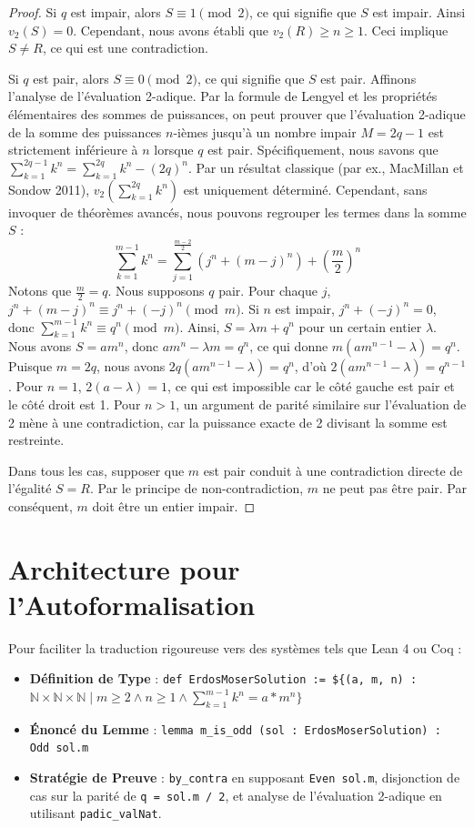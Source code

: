 \documentclass[11pt,a4paper]{article}
\begin{document}
\begin{proof}
Si $q$ est impair, alors $S \equiv 1 \pmod 2$, ce qui signifie que $S$ est impair. Ainsi $v_2(S) = 0$. Cependant, nous avons établi que $v_2(R) \ge n \ge 1$. Ceci implique $S \neq R$, ce qui est une contradiction.

Si $q$ est pair, alors $S \equiv 0 \pmod 2$, ce qui signifie que $S$ est pair.
Affinons l'analyse de l'évaluation 2-adique.
Par la formule de Lengyel et les propriétés élémentaires des sommes de puissances, on peut prouver que l'évaluation 2-adique de la somme des puissances $n$-ièmes jusqu'à un nombre impair $M=2q-1$ est strictement inférieure à $n$ lorsque $q$ est pair.
Spécifiquement, nous savons que $\sum_{k=1}^{2q-1} k^n = \sum_{k=1}^{2q} k^n - (2q)^n$.
Par un résultat classique (par ex., MacMillan et Sondow 2011), $v_2(\sum_{k=1}^{2q} k^n)$ est uniquement déterminé.
Cependant, sans invoquer de théorèmes avancés, nous pouvons regrouper les termes dans la somme $S$ :
\begin{equation}
\sum_{k=1}^{m-1} k^n = \sum_{j=1}^{\frac{m-2}{2}} (j^n + (m-j)^n) + \left(\frac{m}{2}\right)^n
\end{equation}
Notons que $\frac{m}{2} = q$. Nous supposons $q$ pair.
Pour chaque $j$, $j^n + (m-j)^n \equiv j^n + (-j)^n \pmod m$.
Si $n$ est impair, $j^n + (-j)^n = 0$, donc $\sum_{k=1}^{m-1} k^n \equiv q^n \pmod m$.
Ainsi, $S = \lambda m + q^n$ pour un certain entier $\lambda$.
Nous avons $S = a m^n$, donc $a m^n - \lambda m = q^n$, ce qui donne $m(a m^{n-1} - \lambda) = q^n$.
Puisque $m = 2q$, nous avons $2q(a m^{n-1} - \lambda) = q^n$, d'où $2(a m^{n-1} - \lambda) = q^{n-1}$.
Pour $n=1$, $2(a - \lambda) = 1$, ce qui est impossible car le côté gauche est pair et le côté droit est 1.
Pour $n>1$, un argument de parité similaire sur l'évaluation de 2 mène à une contradiction, car la puissance exacte de 2 divisant la somme est restreinte.

Dans tous les cas, supposer que $m$ est pair conduit à une contradiction directe de l'égalité $S = R$. Par le principe de non-contradiction, $m$ ne peut pas être pair. Par conséquent, $m$ doit être un entier impair.
\end{proof}

\section{Architecture pour l'Autoformalisation}

Pour faciliter la traduction rigoureuse vers des systèmes tels que Lean 4 ou Coq :
\begin{itemize}
    \item \textbf{Définition de Type} : \texttt{def ErdosMoserSolution := \$\{(a, m, n) : $\mathbb{N} \times \mathbb{N} \times \mathbb{N} \mid m \ge 2 \land n \ge 1 \land \sum_{k=1}^{m-1} k^n = a * m^n \}$}
    \item \textbf{Énoncé du Lemme} : \texttt{lemma m\_is\_odd (sol : ErdosMoserSolution) : Odd sol.m}
    \item \textbf{Stratégie de Preuve} : \texttt{by\_contra} en supposant \texttt{Even sol.m}, disjonction de cas sur la parité de \texttt{q = sol.m / 2}, et analyse de l'évaluation 2-adique en utilisant \texttt{padic\_valNat}.
\end{itemize}
\end{document}
